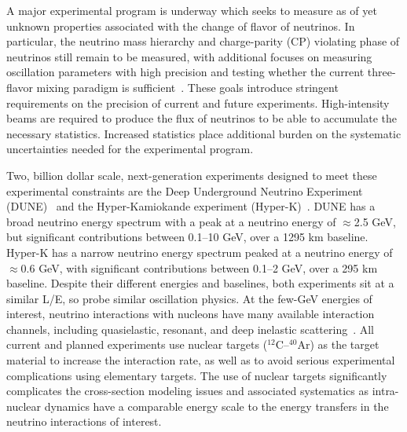 
A major experimental program is underway which seeks to measure
as of yet unknown properties associated with the change of flavor of neutrinos.
In particular, the neutrino mass hierarchy and charge-parity (CP) violating phase
of neutrinos still remain to be measured, with additional focuses on measuring
oscillation parameters with high precision and testing whether the current
three-flavor mixing paradigm is sufficient~\cite{Esteban:2020cvm, ParticleDataGroup:2020ssz}.
These goals introduce stringent requirements on the precision of current and future experiments.
High-intensity beams are required to produce the flux of neutrinos
 to be able to accumulate the necessary statistics.
Increased statistics place additional burden on the systematic uncertainties needed for the experimental program.

Two, billion dollar scale, next-generation experiments designed to meet these experimental constraints
are the Deep Underground Neutrino Experiment (DUNE)~\cite{Abi:2020wmh}
 and the Hyper-Kamiokande experiment (Hyper-K)~\cite{Hyper-Kamiokande:2018ofw}.
DUNE has a broad neutrino energy spectrum with a peak at a neutrino energy of $\approx$2.5 GeV,
but significant contributions between 0.1--10 GeV, over a 1295 km baseline. Hyper-K has a narrow
neutrino energy spectrum peaked at a neutrino energy of $\approx$0.6 GeV, with significant
contributions between 0.1--2 GeV, over a 295 km baseline. Despite their different energies and
baselines, both experiments sit at a similar L/E, so probe similar oscillation physics.
At the few-GeV energies of interest, neutrino interactions with nucleons have many available interaction channels,
 including quasielastic, resonant, and deep inelastic scattering~\cite{zeller12, hayato_review_2014, Mosel:2016cwa, Katori:2016yel, NuSTEC:2017hzk}.
All current and planned experiments use nuclear targets ($^{12}$C--$^{40}$Ar) as the
target material to increase the interaction rate, as well as to avoid serious experimental complications using elementary targets.
The use of nuclear targets significantly complicates the cross-section modeling issues and
associated systematics as intra-nuclear dynamics have a comparable energy scale to
the energy transfers in the neutrino interactions of interest.

